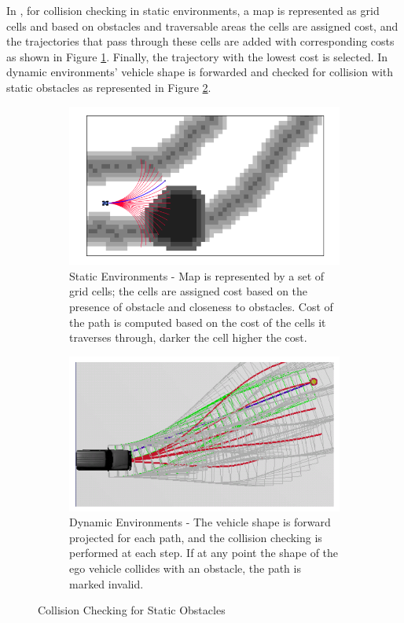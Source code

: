 In \cite{kolski_thesis}, for collision checking in static environments, a map is represented as grid cells and based on obstacles and traversable areas the cells are assigned cost, and the trajectories that pass through these cells are added with corresponding costs as shown in Figure \ref{kolski1}. Finally, the trajectory with the lowest cost is selected. In dynamic environments' vehicle shape is forwarded and checked for collision with static obstacles as represented in Figure \ref{kolski2}.
\begin{figure}
	\centering
	\begin{subfigure}{.49\textwidth}
		\centering
		\includegraphics[width=1.0\linewidth]{Images/related_work/kolskistaticobst.png}
		\caption{Static Environments - Map is represented by a set of grid cells; the cells are assigned cost based on the presence of obstacle and closeness to obstacles. Cost of the path is computed based on the cost of the cells it traverses through, darker the cell higher the cost.}
		\label{kolski1}
	\end{subfigure}\hspace{.01\textwidth}
	\begin{subfigure}{.49\textwidth}
		\centering
		\includegraphics[width=1.0\linewidth]{Images/related_work/dynamiccollsionkolski.png}
		\caption{Dynamic Environments - The vehicle shape is forward projected for each path, and the collision checking is performed at each step. If at any point the shape of the ego vehicle collides with an obstacle, the path is marked invalid.}
		\label{kolski2}
	\end{subfigure}
	\caption{Collision Checking for Static Obstacles \cite{kolski_thesis}}
	\label{kolskicollison}
\end{figure}

